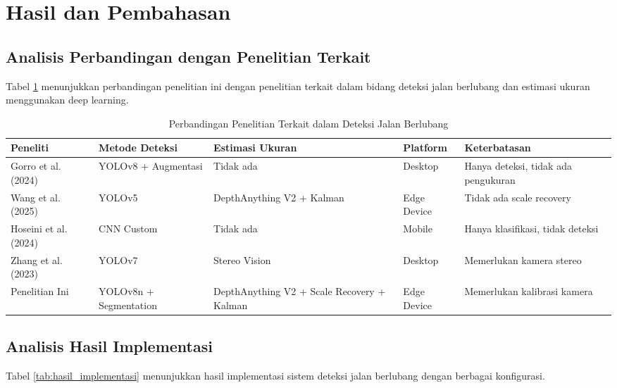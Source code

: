 \documentclass[12pt,a4paper]{article}
\begin{document}
\section{Hasil dan Pembahasan}

\subsection{Analisis Perbandingan dengan Penelitian Terkait}

Tabel \ref{tab:perbandingan_penelitian} menunjukkan perbandingan penelitian ini dengan penelitian terkait dalam bidang deteksi jalan berlubang dan estimasi ukuran menggunakan deep learning.

\begin{table}[H]
\centering
\caption{Perbandingan Penelitian Terkait dalam Deteksi Jalan Berlubang}
\label{tab:perbandingan_penelitian}
\begin{tabular}{|p{3cm}|p{3cm}|p{3cm}|p{3cm}|p{3cm}|}
\hline
\textbf{Peneliti} & \textbf{Metode Deteksi} & \textbf{Estimasi Ukuran} & \textbf{Platform} & \textbf{Keterbatasan} \\
\hline
Gorro et al. (2024) & YOLOv8 + Augmentasi & Tidak ada & Desktop & Hanya deteksi, tidak ada pengukuran \\
\hline
Wang et al. (2025) & YOLOv5 & DepthAnything V2 + Kalman & Edge Device & Tidak ada scale recovery \\
\hline
Hoseini et al. (2024) & CNN Custom & Tidak ada & Mobile & Hanya klasifikasi, tidak deteksi \\
\hline
Zhang et al. (2023) & YOLOv7 & Stereo Vision & Desktop & Memerlukan kamera stereo \\
\hline
Penelitian Ini & YOLOv8n + Segmentation & DepthAnything V2 + Scale Recovery + Kalman & Edge Device & Memerlukan kalibrasi kamera \\
\hline
\end{tabular}
\end{table}

\subsection{Analisis Hasil Implementasi}

Tabel \ref{tab:hasil_implementasi} menunjukkan hasil implementasi sistem deteksi jalan berlubang dengan berbagai konfigurasi.
\end{document}

